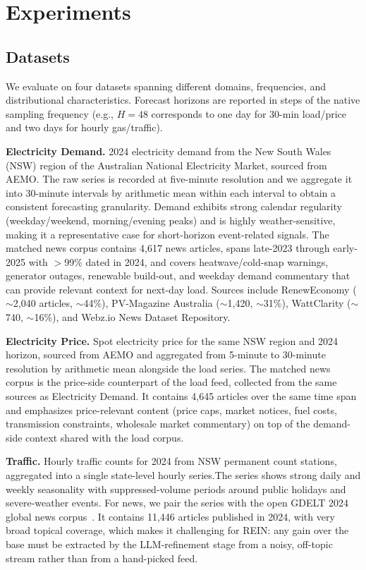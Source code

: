 \documentclass{article}
\newcommand{\method}{REIN\xspace}
\begin{document}
\section{Experiments}
\label{sec:experiments}

\subsection{Datasets}
\label{sec:datasets}

We evaluate on four datasets spanning different domains, frequencies, and distributional characteristics.
Forecast horizons are reported in steps of the native sampling frequency (e.g., $H{=}48$ corresponds to one day for 30-min load/price and two days for hourly gas/traffic).

\textbf{Electricity Demand.} 2024 electricity demand from the New South Wales (NSW) region of the Australian National Electricity Market, sourced from AEMO\citep{aemo_aggregated_data}.
The raw series is recorded at five-minute resolution and we aggregate it into 30-minute intervals by arithmetic mean within each interval to obtain a consistent forecasting granularity.
Demand exhibits strong calendar regularity (weekday/weekend, morning/evening peaks) and is highly weather-sensitive, making it a representative case for short-horizon event-related signals.
The matched news corpus contains  4{,}617 news articles, spans late-2023 through early-2025 with $>$99\% dated in 2024, and covers heatwave/cold-snap warnings, generator outages, renewable build-out, and weekday demand commentary that can provide relevant context for next-day load. Sources include RenewEconomy\citep{reneweconomy} ($\sim$2{,}040 articles, ${\sim}$44\%), PV-Magazine Australia ($\sim$1{,}420, ${\sim}$31\%), WattClarity\citep{wattclarity} ($\sim$740, ${\sim}$16\%), and  Webz.io News Dataset Repository\cite{webhose_free_news_datasets}.


\textbf{Electricity Price.} Spot electricity price for the same NSW region and 2024 horizon, sourced from AEMO and aggregated from 5-minute to 30-minute resolution by arithmetic mean alongside the load series.
The matched news corpus is the price-side counterpart of the load feed, collected from the same sources as Electricity Demand. It contains 4{,}645 articles over the same time span and emphasizes price-relevant content (price caps, market notices, fuel costs, transmission constraints, wholesale market commentary) on top of the demand-side context shared with the load corpus.

\textbf{Traffic.} Hourly traffic counts for 2024 from NSW permanent count stations, aggregated into a single state-level hourly series.The series shows strong daily and weekly seasonality with suppressed-volume periods around public holidays and severe-weather events.
For news, we pair the series with the open GDELT 2024 global news corpus~\citep{gdelt_project}. It contains 11{,}446 articles published in 2024, with very broad topical coverage, which makes it challenging for \method: any gain over the base must be extracted by the LLM-refinement stage from a noisy, off-topic stream rather than from a hand-picked feed.
\end{document}
